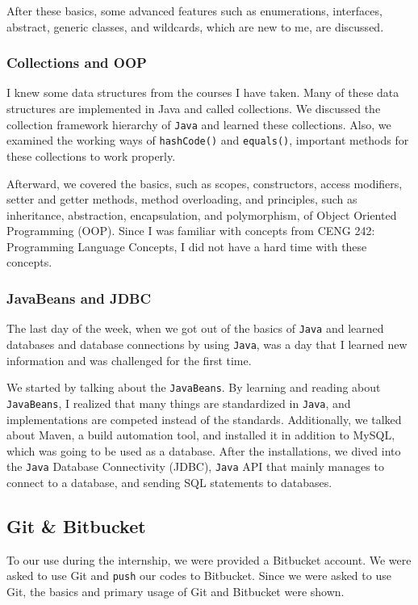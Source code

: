 After these basics, some advanced features such as enumerations, interfaces, abstract, generic classes, and wildcards, which are new to me, are discussed.

\subsubsection{Collections and OOP}

I knew some data structures from the courses I have taken. Many of these data structures are implemented in Java and called collections. We discussed the collection framework hierarchy of \texttt{Java} and learned these collections. Also, we examined the working ways of \texttt{hashCode()} and \texttt{equals()}, important methods for these collections to work properly.

Afterward, we covered the basics, such as scopes, constructors, access modifiers, setter and getter methods, method overloading, and principles, such as inheritance, abstraction, encapsulation, and polymorphism, of Object Oriented Programming (OOP). Since I was familiar with concepts from CENG 242: Programming Language Concepts, I did not have a hard time with these concepts.

\subsubsection{JavaBeans and JDBC}

The last day of the week, when we got out of the basics of \texttt{Java} and learned databases and database connections by using \texttt{Java}, was a day that I learned new information and was challenged for the first time.

We started by talking about the \texttt{JavaBeans}. By learning and reading about \texttt{JavaBeans}, I realized that many things are standardized in \texttt{Java}, and implementations are competed instead of the standards. Additionally, we talked about Maven, a build automation tool, and installed it in addition to MySQL, which was going to be used as a database. After the installations, we dived into the \texttt{Java} Database Connectivity (JDBC),  \texttt{Java} API that mainly manages to connect to a database, and sending SQL statements to databases.


\subsection{Git \& Bitbucket}

To our use during the internship, we were provided a Bitbucket account. We were asked to use Git and \texttt{push} our codes to Bitbucket. Since we were asked to use Git, the basics and primary usage of Git and Bitbucket were shown. 
